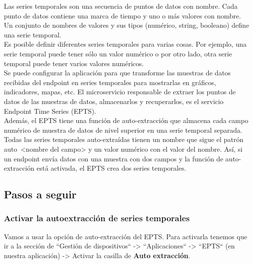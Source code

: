 {Las series temporales son una secuencia de puntos de datos con nombre. Cada punto de datos contiene una marca de tiempo y uno o más valores con nombre. Un conjunto de nombres de valores y sus tipos (numérico, string, booleano) define una serie temporal. \\

Es posible definir diferentes series temporales para varias cosas. Por ejemplo, una serie temporal puede tener sólo un valor numérico o por otro lado, otra serie temporal puede tener varios valores numéricos. \\

Se puede configurar la aplicación para que transforme las muestras de datos recibidas del endpoint en series temporales para mostrarlas en gráficos, indicadores, mapas, etc. El microservicio responsable de extraer los puntos de datos de las muestras de datos, almacenarlos y recuperarlos, es el servicio Endpoint Time Series (EPTS). \\

Además, el EPTS tiene una función de auto-extracción que almacena cada campo numérico de muestra de datos de nivel superior en una serie temporal separada. Todas las series temporales auto-extraídas tienen un nombre que sigue el patrón auto~<nombre del campo> y un valor numérico con el valor del nombre. Así, si un endpoint envía datos con una muestra con dos campos y la función de auto-extracción está activada, el EPTS crea dos series temporales. \\

\subsection{Pasos a seguir}

\subsubsection{Activar la autoextracción de series temporales}

Vamos a usar la opción de auto-extracción del EPTS. Para activarla tenemos que ir a la sección de ``Gestión de dispositivos`` -> ``Aplicaciones`` -> ``EPTS`` (en nuestra aplicación) -> Activar la casilla de \textbf{Auto extracción}. \\

}
